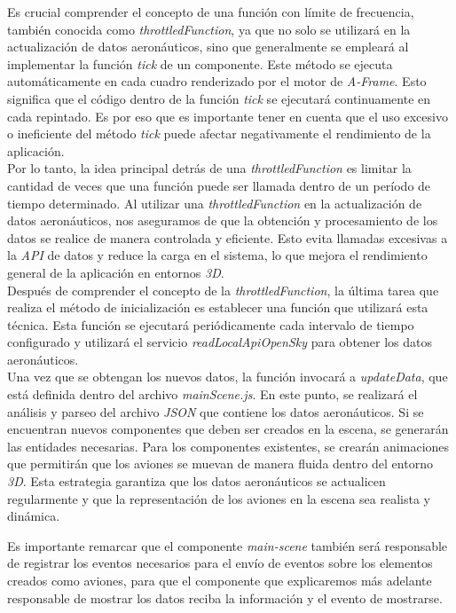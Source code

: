 \documentclass[a4paper, 11pt]{book}
\begin{document}
Es crucial comprender el concepto de una función con límite de frecuencia, también conocida como \emph{throttledFunction}, ya que no solo se utilizará en la actualización de datos aeronáuticos, sino que generalmente se empleará al implementar la función \emph{tick} de un componente. Este método se ejecuta automáticamente en cada cuadro renderizado por el motor de \emph{A-Frame}. Esto significa que el código dentro de la función \emph{tick} se ejecutará continuamente en cada repintado.
Es por eso que es importante tener en cuenta que el uso excesivo o ineficiente del método \emph{tick} puede afectar negativamente el rendimiento de la aplicación. \\
Por lo tanto, la idea principal detrás de una \emph{throttledFunction} es limitar la cantidad de veces que una función puede ser llamada dentro de un período de tiempo determinado.
Al utilizar una \emph{throttledFunction} en la actualización de datos aeronáuticos, nos aseguramos de que la obtención y procesamiento de los datos se realice de manera controlada y eficiente. Esto evita llamadas excesivas a la \emph{API} de datos y reduce la carga en el sistema, lo que mejora el rendimiento general de la aplicación en entornos \emph{3D}.\\
Después de comprender el concepto de la \emph{throttledFunction}, la última tarea que realiza el método de inicialización es establecer una función que utilizará esta técnica. Esta función se ejecutará periódicamente cada intervalo de tiempo configurado y utilizará el servicio \emph{readLocalApiOpenSky} para obtener los datos aeronáuticos.\\
Una vez que se obtengan los nuevos datos, la función invocará a \emph{updateData}, que está definida dentro del archivo \emph{mainScene.js}. En este punto, se realizará el análisis y parseo del archivo \emph{JSON} que contiene los datos aeronáuticos. Si se encuentran nuevos componentes que deben ser creados en la escena, se generarán las entidades necesarias. Para los componentes existentes, se crearán animaciones que permitirán que los aviones se muevan de manera fluida dentro del entorno \emph{3D}.
Esta estrategia garantiza que los datos aeronáuticos se actualicen regularmente y que la representación de los aviones en la escena sea realista y dinámica.

Es importante remarcar que el componente \emph{main-scene} también será responsable de registrar los eventos necesarios para el envío de eventos sobre los elementos creados como aviones, para que el componente que explicaremos más adelante responsable de mostrar los datos reciba la información y el evento de mostrarse.
\end{document}
